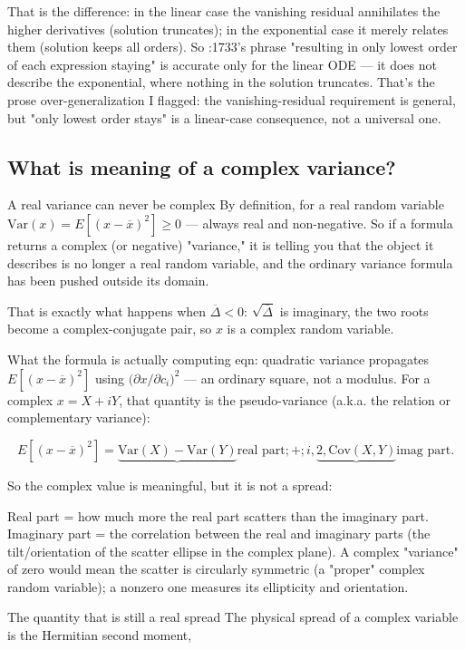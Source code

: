 \documentclass[twoside]{article}
\numberwithin{equation}{section}
\begin{document}
That is the difference: in the linear case the vanishing residual annihilates the higher derivatives (solution truncates); in the exponential case it merely relates them (solution keeps all orders). So :1733's phrase "resulting in only lowest order of each expression staying" is accurate only for the linear ODE — it does not describe the exponential, where nothing in the solution truncates. That's the prose over-generalization I flagged: the vanishing-residual requirement is general, but "only lowest order stays" is a linear-case consequence, not a universal one.

\subsection{What is meaning of a complex variance?}

A real variance can never be complex
By definition, for a real random variable $\text{Var}(x) = E[(x-\overline{x})^2] \ge 0$ — always real and non-negative. So if a formula returns a complex (or negative) "variance," it is telling you that the object it describes is no longer a real random variable, and the ordinary variance formula has been pushed outside its domain.

That is exactly what happens when $\overline{\Delta}<0$: $\sqrt{\overline{\Delta}}$ is imaginary, the two roots become a complex-conjugate pair, so $x$ is a complex random variable.

What the formula is actually computing
eqn: quadratic variance propagates $E[(x-\overline{x})^2]$ using $\big(\partial x/\partial c_i\big)^2$ — an ordinary square, not a modulus. For a complex $x = X + iY$, that quantity is the pseudo-variance (a.k.a. the relation or complementary variance):

$$E[(x-\overline{x})^2] = \underbrace{\text{Var}(X) - \text{Var}(Y)}{\text{real part}} ;+; i,\underbrace{2,\text{Cov}(X,Y)}{\text{imag part}}.$$

So the complex value is meaningful, but it is not a spread:

Real part = how much more the real part scatters than the imaginary part.
Imaginary part = the correlation between the real and imaginary parts (the tilt/orientation of the scatter ellipse in the complex plane).
A complex "variance" of zero would mean the scatter is circularly symmetric (a "proper" complex random variable); a nonzero one measures its ellipticity and orientation.

The quantity that is still a real spread
The physical spread of a complex variable is the Hermitian second moment,
\end{document}
